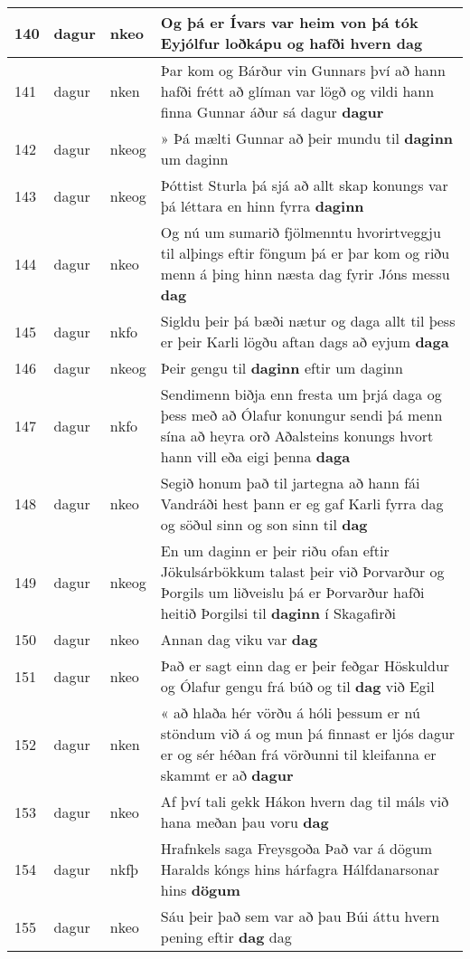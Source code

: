 \documentclass{article}
\begin{document}
\begin{longtable}{p{1cm}|p{1cm}|p{1cm}|p{13cm}}
\hline
140&dagur&nkeo&Og þá er Ívars var heim von þá tók Eyjólfur loðkápu og hafði hvern \textbf{dag} \\
\hline
141&dagur&nken&Þar kom og Bárður vin Gunnars því að hann hafði frétt að glíman var lögð og vildi hann finna Gunnar áður sá dagur \textbf{dagur} \\
\hline
142&dagur&nkeog&» Þá mælti Gunnar að þeir mundu til \textbf{daginn} um daginn\\
\hline
143&dagur&nkeog&Þóttist Sturla þá sjá að allt skap konungs var þá léttara en hinn fyrra \textbf{daginn} \\
\hline
144&dagur&nkeo&Og nú um sumarið fjölmenntu hvorirtveggju til alþings eftir föngum þá er þar kom og riðu menn á þing hinn næsta dag fyrir Jóns messu \textbf{dag} \\
\hline
145&dagur&nkfo&Sigldu þeir þá bæði nætur og daga allt til þess er þeir Karli lögðu aftan dags að eyjum \textbf{daga} \\
\hline
146&dagur&nkeog&Þeir gengu til \textbf{daginn} eftir um daginn\\
\hline
147&dagur&nkfo&Sendimenn biðja enn fresta um þrjá daga og þess með að Ólafur konungur sendi þá menn sína að heyra orð Aðalsteins konungs hvort hann vill eða eigi þenna \textbf{daga} \\
\hline
148&dagur&nkeo&Segið honum það til jartegna að hann fái Vandráði hest þann er eg gaf Karli fyrra dag og söðul sinn og son sinn til \textbf{dag} \\
\hline
149&dagur&nkeog&En um daginn er þeir riðu ofan eftir Jökulsárbökkum talast þeir við Þorvarður og Þorgils um liðveislu þá er Þorvarður hafði heitið Þorgilsi til \textbf{daginn} í Skagafirði\\
\hline
150&dagur&nkeo&Annan dag viku var \textbf{dag} \\
\hline
151&dagur&nkeo&Það er sagt einn dag er þeir feðgar Höskuldur og Ólafur gengu frá búð og til \textbf{dag} við Egil\\
\hline
152&dagur&nken&« að hlaða hér vörðu á hóli þessum er nú stöndum við á og mun þá finnast er ljós dagur er og sér héðan frá vörðunni til kleifanna er skammt er að \textbf{dagur} \\
\hline
153&dagur&nkeo&Af því tali gekk Hákon hvern dag til máls við hana meðan þau voru \textbf{dag} \\
\hline
154&dagur&nkfþ&Hrafnkels saga Freysgoða Það var á dögum Haralds kóngs hins hárfagra Hálfdanarsonar hins \textbf{dögum} \\
\hline
155&dagur&nkeo&Sáu þeir það sem var að þau Búi áttu hvern pening eftir \textbf{dag} dag\\

\end{longtable}
\end{document}
